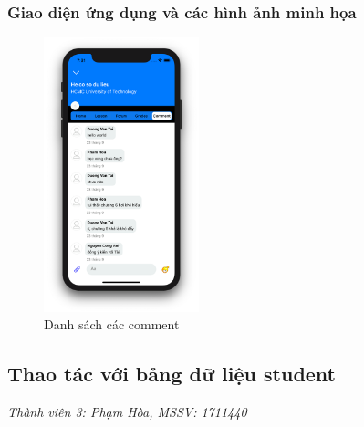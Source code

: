 \documentclass[12pt,a4paper,titlepage]{article}
\begin{document}
\subsubsection{Giao diện ứng dụng và các hình ảnh minh họa}
\newpage
\begin{figure}[h!]
	\centering
	\caption{Danh sách các comment}
	\includegraphics[width=0.4\textwidth]{images/comment1.png}
\end{figure}
\newpage
\subsection{Thao tác với bảng dữ liệu student}
\textit{Thành viên 3: Phạm Hòa, MSSV: 1711440}
\end{document}
